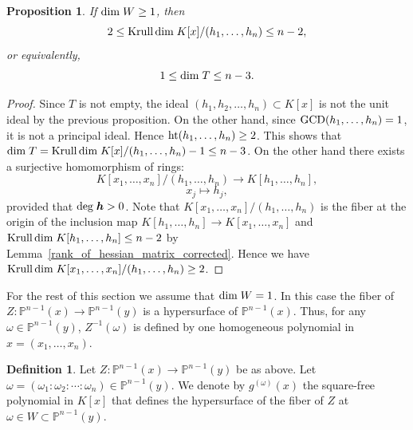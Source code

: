 \documentclass[12pt]{article}
\newtheorem{proposition}[theorem]{Proposition}
\theoremstyle{definition}
\newtheorem{definition}[theorem]{Definition}
\theoremstyle{remark}
\def\dim{{\rm dim}}
\def\deg{{\rm deg}}
\def\boldh{\mbox{\boldmath $h$}}
\def\om{\omega}
\newcommand {\PP}{\mathbb{P}}
\begin{document}
\begin{proposition}  \label{dimension_of_T} \label{yamada's_proposition_3_page38}  %
If $\dim \; W \geq 1$, then 
\[ 2 \leq  \mbox{\rm Krull\,dim}\; K[x]/(h_1, \ldots, h_n) \leq n-2,\]
or equivalently,  
\[ 1 \leq \dim \; T   \leq n-3.\]
\end{proposition}

\begin{proof}
Since $T$ is not empty, the ideal $(h_1, h_2, \ldots, h_n) \subset K[x]$ is not the unit ideal by the previous proposition. 
On the other hand, since ${\rm GCD}(h_1, \ldots, h_n) = 1$, it is not a principal ideal. 
Hence ${\rm ht}(h_1, \ldots, h_n)  \geq 2$.  This shows that $\dim  \; T = {\rm Krull\,dim}\; K[x]/(h_1, \ldots, h_n) -1 \leq n-3$.  
On the other hand there exists a surjective homomorphism of rings:
\[ K[x_1, \ldots, x_n]/(h_1, \ldots, h_n) \rightarrow K[h_1, \ldots, h_n], \]
\[   x_j \mapsto h_j, \]
provided that $\deg \; \boldh > 0$. 
Note that $K[x_1, \ldots, x_n]/(h_1, \ldots, h_n)$ is the fiber at the origin of the
inclusion map  $K[h_1, \ldots, h_n] \rightarrow K[x_1, \ldots, x_n]$ 
and ${\rm Krull\,dim} \; K[h_1, \ldots, h_n] \leq n-2$ by Lemma~\ref{rank_of_hessian_matrix_corrected}. 
Hence  we have 
${\rm Krull\,dim}\;  K[x_1, \ldots, x_n]/(h_1, \ldots, h_n) \geq 2$.
\end{proof}

For the rest of  this section we assume that $\dim \; W=1$.  In this case the fiber 
of $Z : \PP^{n-1}(x) \rightarrow \PP ^{n-1}(y)$ is a hypersurface 
of $\PP ^{n-1}(x)$.  Thus, for any $\om \in \PP^{n-1}(y)$, $Z^{-1}(\om)$ is defined by one homogeneous polynomial in $x=(x_1, \ldots,  x_n)$.  

\begin{definition}  %
Let $Z : \PP ^{n-1} (x) \rightarrow \PP ^{n-1} (y)$ be as above. 
Let $\om =(\om _1 : \om _2: \cdots : \om _n) \in \PP^{n-1}(y)$.  
We denote by $g^{(\om)}(x)$ the square-free polynomial 
in $K[x]$ that defines the hypersurface of the fiber of $Z$ at $\om \in W \subset  \PP ^{n-1}(y)$. 
\end{definition}
\end{document}
